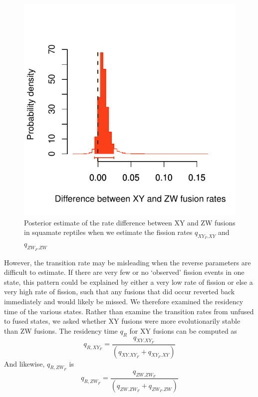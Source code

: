 \documentclass[12pt,twoside]{article}
\begin{document}
\begin{figure}[p]
\centering
\includegraphics[scale=1.25]{figs/karyotype-fusion-squa-6par}
\caption{Posterior estimate of the rate difference between XY and ZW fusions in squamate reptiles when we estimate the fission rates $q_{XY_F.XY}$ and $q_{ZW_F.ZW}$}
\label{fig:squa-dif}
\end{figure}

However, the transition rate may be misleading when the reverse parameters are difficult to estimate. If there are very few or no `observed' fission events in one state, this pattern could be explained by either a very low rate of fission or else a very high rate of fission, such that any fusions that did occur reverted back immediately and would likely be missed. We therefore examined the
residency time of the various states. Rather than examine the transition rates from unfused to fused states, we asked whether XY fusions were more evolutionarily stable than ZW fusions. The residency time $q_R$ for XY fusions can be computed as
\begin{equation}
q_{R,XY_F} = \frac{q_{XY.XY_F}}{(q_{XY.XY_F} + q_{XY_F.XY})}
\end{equation}
And likewise, $q_{R,ZW_F}$ is
\begin{equation}
q_{R,ZW_F} = \frac{q_{ZW.ZW_F}}{(q_{ZW.ZW_F} + q_{ZW_F.ZW})}
\end{equation}
\end{document}
